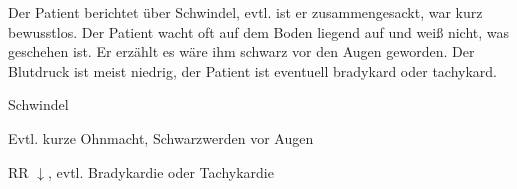 {%
Der Patient berichtet über Schwindel, evtl. ist er
zusammengesackt, war kurz bewusstlos. Der Patient wacht oft
auf dem Boden liegend auf und weiß nicht, was geschehen ist.
Er erzählt  es wäre ihm schwarz vor den Augen geworden. Der
Blutdruck ist meist niedrig, der Patient ist eventuell
bradykard oder tachykard.\bigskip
}{
\begin{compactitem}
  \item Schwindel
  \item Evtl. kurze Ohnmacht, Schwarzwerden vor Augen
  \item RR ${\downarrow}$, evtl. Bradykardie oder Tachykardie
\end{compactitem}
}{}{}{}






